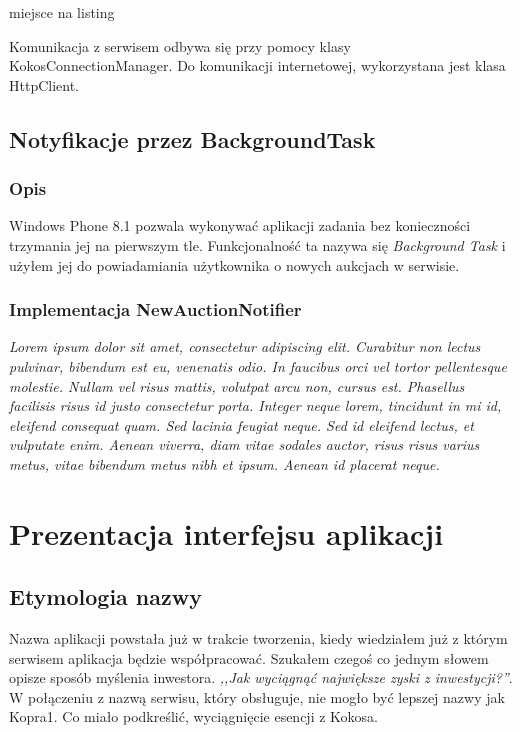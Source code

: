 \documentclass[a4paper,twoside,titlepage,openright]{book}
\begin{document}
{\color{red} miejsce na listing}

Komunikacja z serwisem odbywa się przy pomocy klasy KokosConnectionManager. Do komunikacji internetowej, wykorzystana jest klasa HttpClient.


\section{Notyfikacje przez BackgroundTask}


\subsection{Opis}

Windows Phone 8.1 pozwala wykonywać aplikacji zadania bez konieczności trzymania jej na pierwszym tle. Funkcjonalność ta nazywa się \textit{Background Task} i użyłem jej do powiadamiania użytkownika o nowych aukcjach w serwisie.

\subsection{Implementacja NewAuctionNotifier}

{\color{red}\textit{Lorem ipsum dolor sit amet, consectetur adipiscing elit. Curabitur non lectus pulvinar, bibendum est eu, venenatis odio. In faucibus orci vel tortor pellentesque molestie. Nullam vel risus mattis, volutpat arcu non, cursus est. Phasellus facilisis risus id justo consectetur porta. Integer neque lorem, tincidunt in mi id, eleifend consequat quam. Sed lacinia feugiat neque. Sed id eleifend lectus, et vulputate enim. Aenean viverra, diam vitae sodales auctor, risus risus varius metus, vitae bibendum metus nibh et ipsum. Aenean id placerat neque. }}





\clearpage{\pagestyle{empty}\cleardoublepage}
\chapter{Prezentacja interfejsu aplikacji}

\section{Etymologia nazwy}

Nazwa aplikacji powstała już w trakcie tworzenia, kiedy wiedziałem już z którym serwisem aplikacja będzie współpracować. Szukałem czegoś co jednym słowem opisze sposób myślenia inwestora. \textit{,,Jak wyciągnąć największe zyski z inwestycji?''}. W połączeniu z nazwą serwisu, który obsługuje, nie mogło być lepszej nazwy jak Kopra1. Co miało podkreślić, wyciągnięcie esencji z Kokosa.
\end{document}
